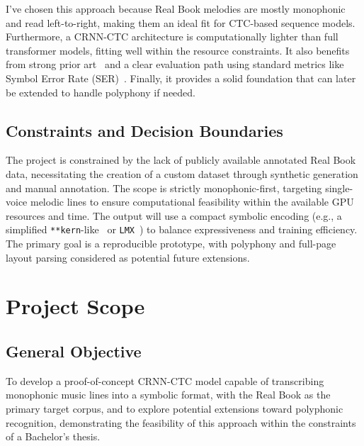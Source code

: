 \documentclass[11pt, a4paper]{article}
\begin{document}
I've chosen this approach because Real Book melodies are mostly monophonic and read left-to-right, making them an ideal fit for CTC-based sequence models. Furthermore, a CRNN-CTC architecture is computationally lighter than full transformer models, fitting well within the resource constraints. It also benefits from strong prior art~\cite{PrIMuSDataset,opticalmusicrecognitionresearchSelfLearningOpticalMusic2019} and a clear evaluation path using standard metrics like Symbol Error Rate (SER)~\cite{SymbolErrorRate}. Finally, it provides a solid foundation that can later be extended to handle polyphony if needed.

\subsection{Constraints and Decision Boundaries}
The project is constrained by the lack of publicly available annotated Real Book data, necessitating the creation of a custom dataset through synthetic generation and manual annotation. The scope is strictly monophonic-first, targeting single-voice melodic lines to ensure computational feasibility within the available GPU resources and time. The output will use a compact symbolic encoding (e.g., a simplified \texttt{**kern}-like~\cite{Humdrum} or \texttt{LMX}~\cite{OMRResearchLmx2025}) to balance expressiveness and training efficiency. The primary goal is a reproducible prototype, with polyphony and full-page layout parsing considered as potential future extensions.

\section{Project Scope}
\subsection{General Objective}
To develop a proof-of-concept CRNN-CTC model capable of transcribing monophonic music lines into a symbolic format, with the Real Book as the primary target corpus, and to explore potential extensions toward polyphonic recognition, demonstrating the feasibility of this approach within the constraints of a Bachelor's thesis.
\end{document}
